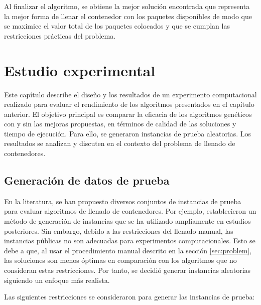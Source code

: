 \documentclass[openany]{article}
\begin{document}
Al finalizar el algoritmo, se obtiene la mejor solución encontrada que representa la mejor forma de llenar el contenedor con los paquetes disponibles de modo que se maximice el valor total de los paquetes colocados y que se cumplan las restricciones prácticas del problema.








\newpage








\section{Estudio experimental}

Este capítulo describe el diseño y los resultados de un experimento computacional realizado para evaluar el rendimiento de los algoritmos presentados en el capítulo anterior. El objetivo principal es comparar la eficacia de los algoritmos genéticos con y sin las mejoras propuestas, en términos de calidad de las soluciones y tiempo de ejecución. Para ello, se generaron instancias de prueba aleatorias. Los resultados se analizan y discuten en el contexto del problema de llenado de contenedores.

\subsection{Generación de datos de prueba}

En la literatura, se han propuesto diversos conjuntos de instancias de prueba para evaluar algoritmos de llenado de contenedores. Por ejemplo, \textcite{BISCHOFF1995377} establecieron un método de generación de instancias que se ha utilizado ampliamente en estudios posteriores. Sin embargo, debido a las restricciones del llenado manual, las instancias públicas no son adecuadas para experimentos computacionales. Esto se debe a que, al usar el procedimiento manual descrito en la sección \ref{sec:problem}, las soluciones son menos óptimas en comparación con los algoritmos que no consideran estas restricciones. Por tanto, se decidió generar instancias aleatorias siguiendo un enfoque más realista.

Las siguientes restricciones se consideraron para generar las instancias de prueba:
\end{document}
